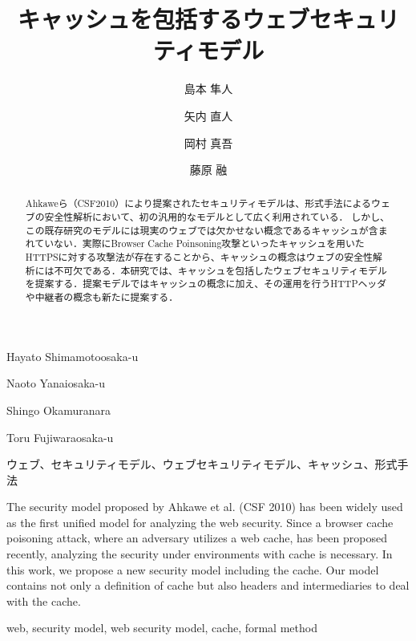 \documentclass{css}
\begin{document}
\title{キャッシュを包括するウェブセキュリティモデル}


\author{島本 隼人}{Hayato Shimamoto}{osaka-u}
\author{矢内 直人}{Naoto Yanai}{osaka-u}
\author{岡村 真吾}{Shingo Okamura}{nara}
\author{藤原 融}{Toru Fujiwara}{osaka-u}


\begin{abstract}
Ahkaweら（CSF2010）により提案されたセキュリティモデルは、形式手法によるウェブの安全性解析において、初の汎用的なモデルとして広く利用されている．
しかし、この既存研究のモデルには現実のウェブでは欠かせない概念であるキャッシュが含まれていない．実際にBrowser Cache Poinsoning攻撃といったキャッシュを用いたHTTPSに対する攻撃法が存在することから、キャッシュの概念はウェブの安全性解析には不可欠である．本研究では、キャッシュを包括したウェブセキュリティモデルを提案する．提案モデルではキャッシュの概念に加え、その運用を行うHTTPヘッダや中継者の概念も新たに提案する．
\end{abstract}

\begin{jkeyword}
ウェブ、セキュリティモデル、ウェブセキュリティモデル、キャッシュ、形式手法
\end{jkeyword}

\begin{eabstract}
The security model proposed by Ahkawe et al. (CSF 2010) has been widely used as the first unified model for analyzing the web security. Since a browser cache poisoning attack, where an adversary utilizes a web cache, has been proposed recently, analyzing the security under environments with cache is necessary. In this work, we propose a new security model including the cache. Our model contains not only a definition of cache but also headers and intermediaries to deal with the cache. 
\end{eabstract}

\begin{ekeyword}
web, security model, web security model, cache, formal method
\end{ekeyword}

\maketitle
\end{document}
